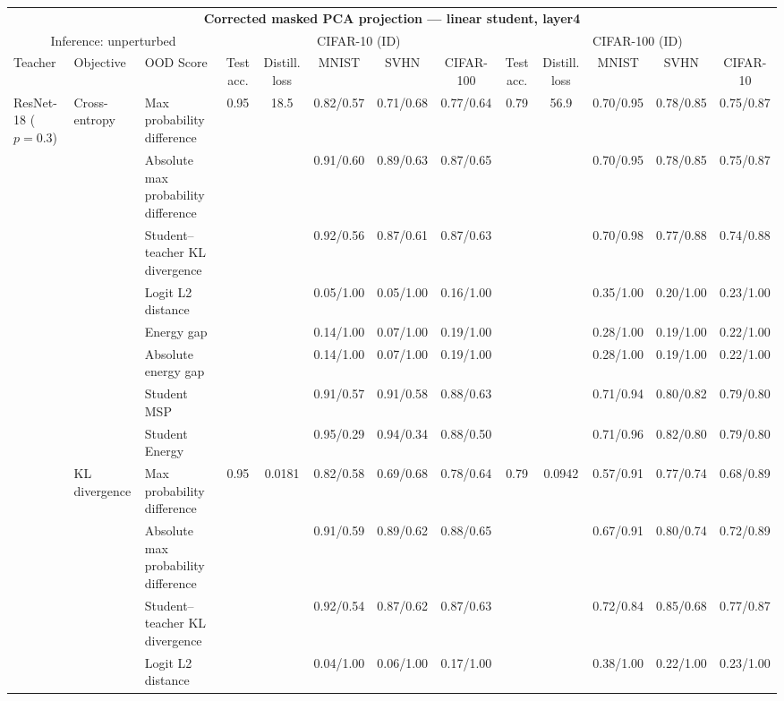 \documentclass[border=2pt]{standalone}
\begin{document}
\scriptsize
\setlength{\tabcolsep}{3pt}
\begin{tabular}{lllcccccccccc}
\multicolumn{13}{c}{\textbf{Corrected masked PCA projection --- linear student, layer4}}\\[4pt]
\multicolumn{3}{c}{Inference: unperturbed} & \multicolumn{5}{c}{CIFAR-10 (ID)} & \multicolumn{5}{c}{CIFAR-100 (ID)} \\
\cmidrule(lr){4-8} \cmidrule(lr){9-13}
\toprule
Teacher & Objective & OOD Score & Test acc. & Distill. loss & MNIST & SVHN & CIFAR-100 & Test acc. & Distill. loss & MNIST & SVHN & CIFAR-10 \\
\midrule
ResNet-18 ($p=0.3$) & Cross-entropy & Max probability difference & 0.95 & 18.5 & 0.82/0.57 & 0.71/0.68 & 0.77/0.64 & 0.79 & 56.9 & 0.70/0.95 & 0.78/0.85 & 0.75/0.87 \\
 &  & Absolute max probability difference &  &  & 0.91/0.60 & 0.89/0.63 & 0.87/0.65 &  &  & 0.70/0.95 & 0.78/0.85 & 0.75/0.87 \\
 &  & Student--teacher KL divergence &  &  & 0.92/0.56 & 0.87/0.61 & 0.87/0.63 &  &  & 0.70/0.98 & 0.77/0.88 & 0.74/0.88 \\
 &  & Logit L2 distance &  &  & 0.05/1.00 & 0.05/1.00 & 0.16/1.00 &  &  & 0.35/1.00 & 0.20/1.00 & 0.23/1.00 \\
 &  & Energy gap &  &  & 0.14/1.00 & 0.07/1.00 & 0.19/1.00 &  &  & 0.28/1.00 & 0.19/1.00 & 0.22/1.00 \\
 &  & Absolute energy gap &  &  & 0.14/1.00 & 0.07/1.00 & 0.19/1.00 &  &  & 0.28/1.00 & 0.19/1.00 & 0.22/1.00 \\
 &  & Student MSP &  &  & 0.91/0.57 & 0.91/0.58 & 0.88/0.63 &  &  & 0.71/0.94 & 0.80/0.82 & 0.79/0.80 \\
 &  & Student Energy &  &  & 0.95/0.29 & 0.94/0.34 & 0.88/0.50 &  &  & 0.71/0.96 & 0.82/0.80 & 0.79/0.80 \\
\addlinespace
 & KL divergence & Max probability difference & 0.95 & 0.0181 & 0.82/0.58 & 0.69/0.68 & 0.78/0.64 & 0.79 & 0.0942 & 0.57/0.91 & 0.77/0.74 & 0.68/0.89 \\
 &  & Absolute max probability difference &  &  & 0.91/0.59 & 0.89/0.62 & 0.88/0.65 &  &  & 0.67/0.91 & 0.80/0.74 & 0.72/0.89 \\
 &  & Student--teacher KL divergence &  &  & 0.92/0.54 & 0.87/0.62 & 0.87/0.63 &  &  & 0.72/0.84 & 0.85/0.68 & 0.77/0.87 \\
 &  & Logit L2 distance &  &  & 0.04/1.00 & 0.06/1.00 & 0.17/1.00 &  &  & 0.38/1.00 & 0.22/1.00 & 0.23/1.00 \\

\end{tabular}
\end{document}
